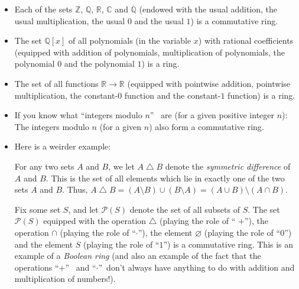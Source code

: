 \documentclass[numbers=enddot,12pt,final,onecolumn,notitlepage]{scrartcl}%
\theoremstyle{definition}
\begin{document}
\begin{itemize}
\item Each of the sets $\mathbb{Z}$, $\mathbb{Q}$, $\mathbb{R}$, $\mathbb{C}$
and $\overline{\mathbb{Q}}$ (endowed with the usual addition, the usual
multiplication, the usual $0$ and the usual $1$) is a commutative ring.

\item The set $\mathbb{Q}\left[  x\right]  $ of all polynomials (in the
variable $x$) with rational coefficients (equipped with addition of
polynomials, multiplication of polynomials, the polynomial $0$ and the
polynomial $1$) is a ring.

\item The set of all functions $\mathbb{R}\rightarrow\mathbb{R}$ (equipped
with pointwise addition, pointwise multiplication, the constant-$0$ function
and the constant-$1$ function) is a ring.

\item If you know what \textquotedblleft integers modulo $n$\textquotedblright%
\ are (for a given positive integer $n$): The integers modulo $n$ (for a given
$n$) also form a commutative ring.

\item Here is a weirder example:

For any two sets $A$ and $B$, we let $A\bigtriangleup B$ denote the
\textit{symmetric difference} of $A$ and $B$. This is the set of all elements
which lie in exactly one of the two sets $A$ and $B$. Thus, $A\bigtriangleup
B=\left(  A\setminus B\right)  \cup\left(  B\setminus A\right)  =\left(  A\cup
B\right)  \setminus\left(  A\cap B\right)  $.

Fix some set $S$, and let $\mathcal{P}\left(  S\right)  $ denote the set of
all subsets of $S$. The set $\mathcal{P}\left(  S\right)  $ equipped with the
operation $\bigtriangleup$ (playing the role of \textquotedblleft%
$+$\textquotedblright), the operation $\cap$ (playing the role of
\textquotedblleft$\cdot$\textquotedblright), the element $\varnothing$
(playing the role of \textquotedblleft$0$\textquotedblright) and the element
$S$ (playing the role of \textquotedblleft$1$\textquotedblright) is a
commutative ring. This is an example of a \textit{Boolean ring} (and also an
example of the fact that the operations \textquotedblleft$+$\textquotedblright%
\ and \textquotedblleft$\cdot$\textquotedblright\ don't always have anything
to do with addition and multiplication of numbers!).
\end{itemize}
\end{document}
